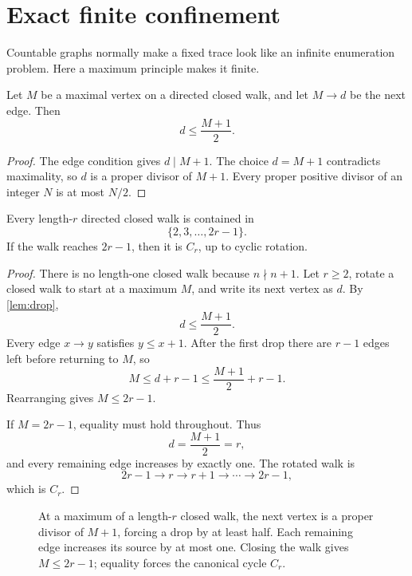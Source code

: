 \section{Exact finite confinement}
\label{sec:confinement}

Countable graphs normally make a fixed trace look like an infinite
enumeration problem.  Here a maximum principle makes it finite.

\begin{lemma}
\label{lem:drop}
Let \(M\) be a maximal vertex on a directed closed walk, and let \(M\to d\)
be the next edge.  Then
\[
 d\le\frac{M+1}{2}.
\]
\end{lemma}

\begin{proof}
The edge condition gives \(d\mid M+1\).  The choice \(d=M+1\) contradicts
maximality, so \(d\) is a proper divisor of \(M+1\).  Every proper positive
divisor of an integer \(N\) is at most \(N/2\).
\end{proof}

\begin{theorem}
\label{thm:confinement}
Every length-\(r\) directed closed walk is contained in
\[
 \{2,3,\ldots,2r-1\}.
\]
If the walk reaches \(2r-1\), then it is \(C_r\), up to cyclic rotation.
\end{theorem}

\begin{proof}
There is no length-one closed walk because \(n\nmid n+1\).  Let \(r\ge2\),
rotate a closed walk to start at a maximum \(M\), and write its next vertex
as \(d\).  By \cref{lem:drop},
\[
 d\le\frac{M+1}{2}.
\]
Every edge \(x\to y\) satisfies \(y\le x+1\).  After the first drop there are
\(r-1\) edges left before returning to \(M\), so
\[
 M\le d+r-1
 \le\frac{M+1}{2}+r-1.
\]
Rearranging gives \(M\le2r-1\).

If \(M=2r-1\), equality must hold throughout.  Thus
\[
 d=\frac{M+1}{2}=r,
\]
and every remaining edge increases by exactly one.  The rotated walk is
\[
 2r-1\to r\to r+1\to\cdots\to2r-1,
\]
which is \(C_r\).
\end{proof}

\begin{figure}[t]
\centering
\resizebox{0.92\textwidth}{!}{}
\caption{At a maximum of a length-\(r\) closed walk, the next vertex is a
proper divisor of \(M+1\), forcing a drop by at least half.  Each remaining
edge increases its source by at most one.  Closing the walk gives
\(M\le2r-1\); equality forces the canonical cycle \(C_r\).}
\label{fig:confinement}
\end{figure}

